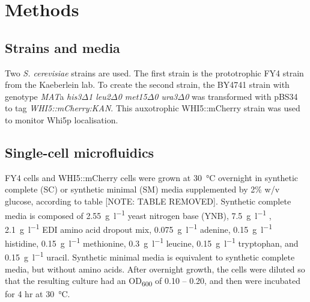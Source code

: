 
\chapter{Methods}
\label{ch:methods}

\section{Strains and media}
\label{sec:methods-strains_media}


Two \emph{S. cerevisiae} strains are used.
The first strain is the prototrophic FY4 strain \parencite{winstonConstructionSetConvenient1995, brachmannDesignerDeletionStrains1998} from the Kaeberlein lab.
To create the second strain, the BY4741 strain with genotype \emph{MAT}a \emph{his3$\Delta$1 leu2$\Delta$0 met15$\Delta$0 ura3$\Delta$0} \parencite{brachmannDesignerDeletionStrains1998} was transformed with pBS34 \parencite{haileyFluorescenceResonanceEnergy2002} to tag \emph{WHI5::mCherry:KAN}.
This auxotrophic WHI5::mCherry strain was used to monitor Whi5p localisation.


\section{Single-cell microfluidics}
\label{sec:methods-microfluidics}


FY4 cells and WHI5::mCherry cells were grown at \SI{30}{\celsius} overnight in synthetic complete (SC) or synthetic minimal (SM) media supplemented by 2\% w/v glucose, according to table [NOTE: TABLE REMOVED].
Synthetic complete media is composed of \SI{2.55}{\gram\per\litre} yeast nitrogen base (YNB), \SI{7.5}{\gram\per\litre} , \SI{2.1}{\gram\per\litre} EDI amino acid dropout mix, \SI{0.075}{\gram\per\litre} adenine, \SI{0.15}{\gram\per\litre} histidine, \SI{0.15}{\gram\per\litre} methionine, \SI{0.3}{\gram\per\litre} leucine, \SI{0.15}{\gram\per\litre} tryptophan, and \SI{0.15}{\gram\per\litre} uracil.
Synthetic minimal media is equivalent to synthetic complete media, but without amino acids.
After overnight growth, the cells were diluted so that the resulting culture had an OD\textsubscript{600} of 0.10 -- 0.20, and then were incubated for 4 hr at \SI{30}{\celsius}.

